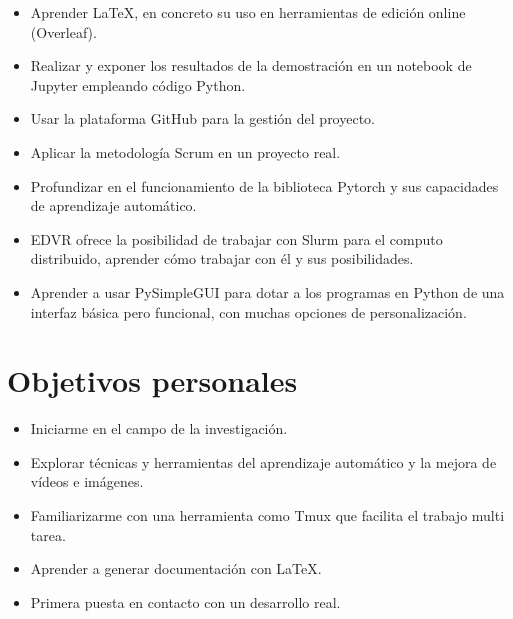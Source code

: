 \begin{itemize}
    \item Aprender  \LaTeX{}, en concreto su uso en herramientas de edición online (Overleaf).
    
    \item Realizar y exponer los resultados de la demostración en un  notebook de Jupyter empleando código Python.
    
    \item Usar la plataforma GitHub para la gestión del proyecto.
    
    \item Aplicar la metodología Scrum en un proyecto real.
    
    \item Profundizar en el funcionamiento de la biblioteca Pytorch y sus capacidades de aprendizaje automático.
    
    \item EDVR ofrece la posibilidad de trabajar con Slurm para el computo distribuido, aprender cómo trabajar con él y sus posibilidades.
    
    \item Aprender a usar PySimpleGUI para dotar a los programas en Python de una interfaz básica pero funcional, con muchas opciones de personalización.
    
    
    
\end{itemize}


\section{Objetivos personales}

\begin{itemize}
    \item Iniciarme en el campo de la investigación.
    \item Explorar técnicas y herramientas del aprendizaje automático y la mejora de vídeos e imágenes.
    \item Familiarizarme con una herramienta como Tmux que facilita el trabajo multi tarea.
    \item Aprender a generar documentación con \LaTeX{}.
    \item Primera puesta en contacto con un desarrollo real.
    
\end{itemize}
